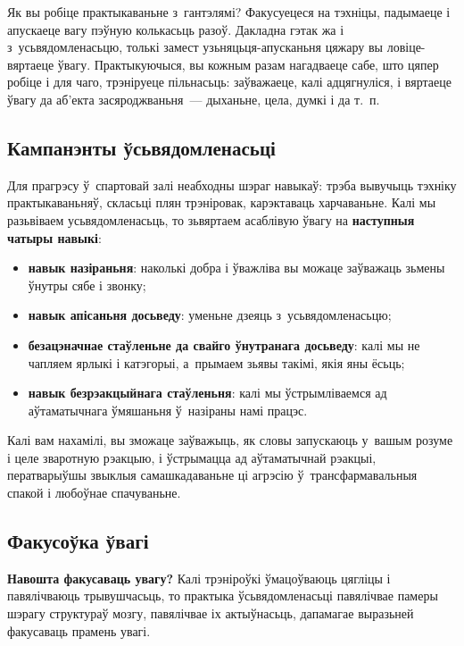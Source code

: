 Як вы робіце практыкаваньне з~гантэлямі? Факусуецеся на тэхніцы, падымаеце і апускаеце вагу пэўную колькасьць разоў. Дакладна гэтак жа і з~усьвядомленасьцю, толькі замест узьняцьця-апусканьня цяжару вы ловіце-вяртаеце ўвагу. Практыкуючыся, вы кожным разам нагадваеце сабе, што цяпер робіце і для чаго, трэніруеце пільнасьць: заўважаеце, калі адцягнуліся, і вяртаеце ўвагу да аб'екта засяроджваньня~--- дыханьне, цела, думкі і да т.~п.

\subsection*{Кампанэнты ўсьвядомленасьці}

Для прагрэсу ў~спартовай залі неабходны шэраг навыкаў: трэба вывучыць тэхніку практыкаваньняў, скласьці плян трэніровак, карэктаваць харчаваньне. Калі мы разьвіваем усьвядомленасьць, то зьвяртаем асаблівую ўвагу на \textbf{наступныя чатыры навыкі}: 
\begin{itemize}
  \item \textbf{навык назіраньня}: наколькі добра і ўважліва вы можаце заўважаць зьмены ўнутры сябе і звонку;
  \item \textbf{навык апісаньня досьведу}: уменьне дзеяць з~усьвядомленасьцю;
  \item \textbf{безацэначнае стаўленьне да свайго ўнутранага досьведу}: калі мы не чапляем ярлыкі і катэгорыі, а~прымаем зьявы такімі, якія яны ёсьць;
  \item \textbf{навык безрэакцыйнага стаўленьня}: калі мы ўстрымліваемся ад аўтаматычнага ўмяшаньня ў~назіраны намі працэс.
\end{itemize}

Калі вам нахамілі, вы зможаце заўважыць, як словы запускаюць у~вашым розуме і целе зваротную рэакцыю, і ўстрымацца ад аўтаматычнай рэакцыі, ператварыўшы звыклыя самашкадаваньне ці агрэсію ў~трансфармавальныя спакой і любоўнае спачуваньне.


\subsection*{Факусоўка ўвагі}

\textbf{Навошта факусаваць увагу?} Калі трэніроўкі ўмацоўваюць цягліцы і павялічваюць трывушчасьць, то практыка ўсьвядомленасьці павялічвае памеры шэрагу структураў мозгу, павялічвае іх актыўнасьць, дапамагае выразьней факусаваць прамень увагі.


